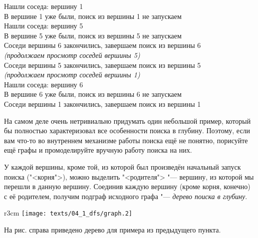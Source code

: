 {\ind \ind Нашли соседа: вершину 1\\
\ind \ind В вершине 1 уже были, поиск из вершины 1 не запускаем\\
\ind \ind Нашли соседа: вершину 5\\
\ind \ind В вершине 5 уже были, поиск из вершины 5 не запускаем\\
\ind \ind Соседи вершины 6 закончились, завершаем поиск из вершины 6\\
\ind \textit{(продолжаем просмотр соседей вершины 5)}\\
\ind Соседи вершины 5 закончились, завершаем поиск из вершины 5\\
\textit{(продолжаем просмотр соседей вершины 1)}\\
Нашли соседа: вершину 6\\\nopagebreak
В вершине 6 уже были, поиск из вершины 6 не запускаем\\\nopagebreak
Соседи вершины 1 закончились, завершаем поиск из вершины 1\\

}
\pagebreak[3]

На самом деле очень нетривиально придумать один небольшой пример, который бы полностью характеризовал все 
особенности поиска в глубину. Поэтому, если вам что-то во внутреннем механизме работы поиска ещё не 
понятно, порисуйте ещё графы и промоделируйте вручную работу поиска на них.

 У каждой вершины, кроме той, из которой был произведён начальный 
запуск поиска ("<корня">), можно выделить "<родителя"> "--- вершину, из которой мы перешли в данную вершину. 
Соединив каждую вершину (кроме корня, конечно) с её родителем, получим подграф исходного графа "--- 
\textit{дерево поиска в глубину}.

\begin{wrapfigure}[5]{r}{3cm}
\vspace{-0.7cm}
\texttt{[image: texts/04\_1\_dfs/graph.2]}
\end{wrapfigure}


На рис. справа приведено дерево для примера из предыдущего пункта.

